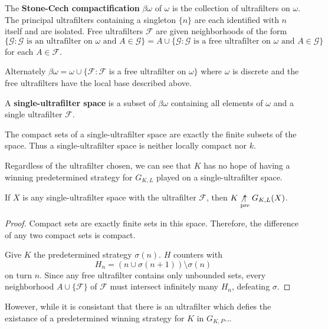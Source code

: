 \begin{defn}
The \textbf{Stone-Cech compactification} $\beta\omega$ of $\omega$ is the collection of ultrafilters on $\omega$. The principal ultrafilters containing a singleton $\{n\}$ are each identified with $n$ itself and are isolated. Free ultrafilters $\mathcal{F}$ are given neighborhoods of the form \[\{\mathcal{G} : \mathcal{G} \text{ is an ultrafilter on } \omega \text{ and } A \in \mathcal{G}\} = A \cup \{\mathcal{G}: \mathcal{G} \text{ is a free ultrafilter on } \omega \text{ and } A \in \mathcal{G}\}\] for each $A\in\mathcal{F}$.

Alternately $\beta\omega=\omega\cup\{\mathcal{F} : \mathcal{F}$ is a free ultrafilter on $\omega\}$ where $\omega$ is discrete and the free ultrafilters have the local base described above.
\end{defn}

\begin{defn}
A \textbf{single-ultrafilter space} is a subset of $\beta\omega$ containing all elements of $\omega$ and a single ultrafilter $\mathcal{F}$.
\end{defn}

\begin{prop}
The compact sets of a single-ultrafilter space are exactly the finite subsets of the space. Thus a single-ultrafilter space is neither locally compact nor $k$.
\end{prop}

Regardless of the ultrafilter chosen, we can see that $K$ has no hope of having a winning predetermined strategy for $G_{K,L}$ played on a single-ultrafilter space.

\begin{prop}
If $X$ is any single-ultrafilter space with the ultrafilter $\mathcal{F}$, then $K\not\underset{\text{pre}}{\uparrow} G_{K,L}(X)$.
\end{prop}

\begin{proof}
Compact sets are exactly finite sets in this space. Therefore, the difference of any two compact sets is compact.

Give $K$ the predetermined strategy $\sigma(n)$. $H$ counters with \[H_n=(n\cup\sigma(n+1))\setminus\sigma(n)\] on turn $n$. Since any free ultrafilter contains only unbounded sets, every neighborhood $A\cup\{\mathcal{F}\}$ of $\mathcal{F}$ must intersect infinitely many $H_n$, defeating $\sigma$.
\end{proof}

However, while it is consistant that there is an ultrafilter which defies the existance of a predetermined winning strategy for $K$ in $G_{K,P}$...

